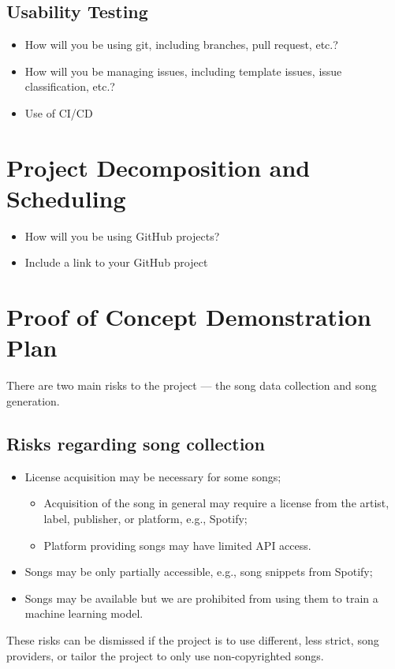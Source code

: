 \documentclass{article}
\begin{document}
\subsection{Usability Testing}
\begin{itemize}
	\item How will you be using git, including branches, pull request, etc.?
	\item How will you be managing issues, including template issues, issue
	classification, etc.?
  \item Use of CI/CD
\end{itemize}

\section{Project Decomposition and Scheduling}

\begin{itemize}
  \item How will you be using GitHub projects?
  \item Include a link to your GitHub project
\end{itemize}


\section{Proof of Concept Demonstration Plan}
There are two main risks to the project --- the song data collection and song generation.

\subsection{Risks regarding song collection}
\begin{itemize}
  \item License acquisition may be necessary for some songs;
  \begin{itemize}
    \item Acquisition of the song in general may require a license from the artist, label, publisher, or platform, e.g., Spotify;
    \item Platform providing songs may have limited API access.
  \end{itemize}
  \item Songs may be only partially accessible, e.g., song snippets from Spotify;
  \item Songs may be available but we are prohibited from using them to train a machine learning model.
\end{itemize}
These risks can be dismissed if the project is to use different, less strict, song providers, or tailor the project to only use non-copyrighted songs.
\end{document}
